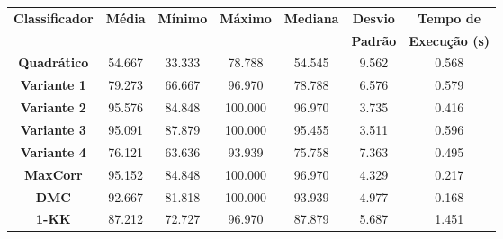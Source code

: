 \begin{tabular}{|c|c|c|c|c|c|c|}%
\hline%
\multirow{2}{*}{\textbf{Classificador}}&\multirow{2}{*}{\textbf{Média}}&\multirow{2}{*}{\textbf{Mínimo}}&\multirow{2}{*}{\textbf{Máximo}}&\multirow{2}{*}{\textbf{Mediana}}&\textbf{Desvio}&\textbf{Tempo de}\\%
&&&&&\textbf{Padrão}&\textbf{Execução (s)}\\%
\hline%
\hline%
\textbf{Quadrático}&54.667&33.333&78.788&54.545&9.562&0.568\\%
\hline%
\textbf{Variante 1}&79.273&66.667&96.970&78.788&6.576&0.579\\%
\hline%
\textbf{Variante 2}&95.576&84.848&100.000&96.970&3.735&0.416\\%
\hline%
\textbf{Variante 3}&95.091&87.879&100.000&95.455&3.511&0.596\\%
\hline%
\textbf{Variante 4}&76.121&63.636&93.939&75.758&7.363&0.495\\%
\hline%
\textbf{MaxCorr}&95.152&84.848&100.000&96.970&4.329&0.217\\%
\hline%
\textbf{DMC}&92.667&81.818&100.000&93.939&4.977&0.168\\%
\hline%
\textbf{1{-}KK}&87.212&72.727&96.970&87.879&5.687&1.451\\%
\hline%
\hline%
\end{tabular}
